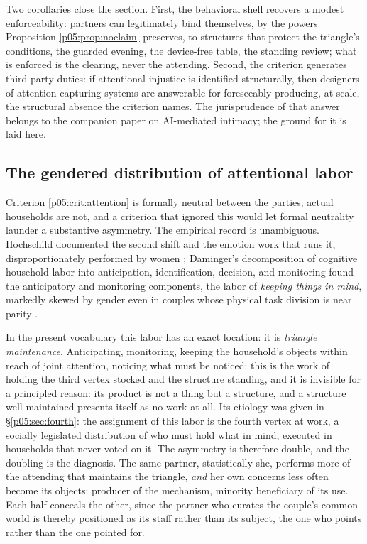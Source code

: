 \documentclass[11pt,a4paper]{article}
\theoremstyle{seriesthm}
\begin{document}
Two corollaries close the section. First, the behavioral shell recovers a modest enforceability: partners can legitimately bind themselves, by the powers Proposition \ref{p05:prop:noclaim} preserves, to structures that protect the triangle's conditions, the guarded evening, the device-free table, the standing review; what is enforced is the clearing, never the attending. Second, the criterion generates third-party duties: if attentional injustice is identified structurally, then designers of attention-capturing systems are answerable for foreseeably producing, at scale, the structural absence the criterion names. The jurisprudence of that answer belongs to the companion paper on AI-mediated intimacy; the ground for it is laid here.

\subsection{The gendered distribution of attentional labor}
\label{p05:sec:gender}

Criterion \ref{p05:crit:attention} is formally neutral between the parties; actual households are not, and a criterion that ignored this would let formal neutrality launder a substantive asymmetry. The empirical record is unambiguous. Hochschild documented the second shift and the emotion work that runs it, disproportionately performed by women \parencite{hochschild1989, hochschild1983}; Daminger's decomposition of cognitive household labor into anticipation, identification, decision, and monitoring found the anticipatory and monitoring components, the labor of \emph{keeping things in mind}, markedly skewed by gender even in couples whose physical task division is near parity \parencite{daminger2019}.

In the present vocabulary this labor has an exact location: it is \emph{triangle maintenance}. Anticipating, monitoring, keeping the household's objects within reach of joint attention, noticing what must be noticed: this is the work of holding the third vertex stocked and the structure standing, and it is invisible for a principled reason: its product is not a thing but a structure, and a structure well maintained presents itself as no work at all. Its etiology was given in §\ref{p05:sec:fourth}: the assignment of this labor is the fourth vertex at work, a socially legislated distribution of who must hold what in mind, executed in households that never voted on it. The asymmetry is therefore double, and the doubling is the diagnosis. The same partner, statistically she, performs more of the attending that maintains the triangle, \emph{and} her own concerns less often become its objects: producer of the mechanism, minority beneficiary of its use. Each half conceals the other, since the partner who curates the couple's common world is thereby positioned as its staff rather than its subject, the one who points rather than the one pointed for.
\end{document}
